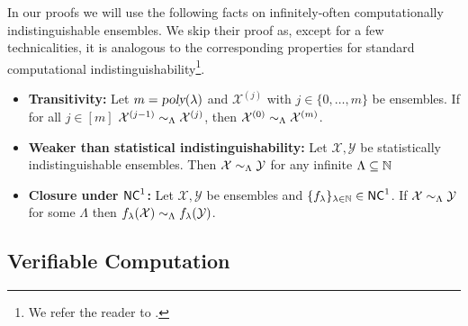 
In our proofs we will use the following facts on infinitely-often computationally indistinguishable ensembles. We skip their proof as, except for a few technicalities, it is analogous to the corresponding properties for standard computational indistinguishability\footnote{We refer the reader to \cite{goldreich2009foundations1}.}.

\begin{lemma}
\label{lemma:hyb-arg}
\label{lemma:facts-lind}
\begin{itemize}
\item \textbf{Transitivity:}
Let $m = {\textsl{poly}}(\lambda)$ and $\mathcal{X}^{(j)}$ with $j \in \{0,\dots,m \} $ be ensembles.
If for all $j \in [m]$ $\mathcal{X}^{(j-1)} \sim_{\Lambda} \mathcal{X}^{(j)}$, then $\mathcal{X}^{(0)} \sim_{\Lambda} \mathcal{X}^{(m)}$.
\item \textbf{Weaker than statistical indistinguishability:} Let $\mathcal{X}, \mathcal{Y}$ be statistically indistinguishable ensembles. Then $\mathcal{X} \sim_{\Lambda} \mathcal{Y}$ for any infinite $\Lambda \subseteq \mathbb{N}$
\item \textbf{Closure under ${\mathsf{NC}}^1$:}  Let $\mathcal{X}, \mathcal{Y}$ be ensembles and $\{f_{\lambda}\}_{\lambda\in\mathbb{N}} \in {\ensuremath{\mathsf{NC}}}^1$. If $\mathcal{X} \sim_{\Lambda} \mathcal{Y}$ for some $\Lambda$ then 
$f_{\lambda}(\mathcal{X}) \sim_{\Lambda} f_{\lambda}(\mathcal{Y})$.
\end{itemize}
\end{lemma}







\subsection{Verifiable Computation}


